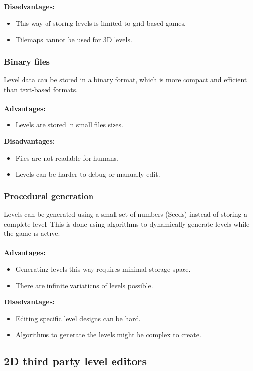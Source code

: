 \documentclass{article} %
\begin{document}
\noindent\textbf{Disadvantages:}
\begin{itemize}
	\item This way of storing levels is limited to grid-based games.
	\item Tilemaps cannot be used for 3D levels.
\end{itemize}

\subsubsection{Binary files}
Level data can be stored in a binary format, which is more compact and efficient than text-based formats.
\\\\
\textbf{Advantages:}
\begin{itemize}
	\item Levels are stored in small files sizes.
\end{itemize}
\noindent\textbf{Disadvantages:}
\begin{itemize}
	\item Files are not readable for humans.
	\item Levels can be harder to debug or manually edit.
\end{itemize}

\subsubsection{Procedural generation}
Levels can be generated using a small set of numbers (Seeds) instead of storing a complete level.
This is done using algorithms to dynamically generate levels while the game is active.
\\\\
\textbf{Advantages:}
\begin{itemize}
	\item Generating levels this way requires minimal storage space.
	\item There are infinite variations of levels possible.
\end{itemize}
\noindent\textbf{Disadvantages:}
\begin{itemize}
	\item Editing specific level designs can be hard.
	\item Algorithms to generate the levels might be complex to create.
\end{itemize}

\subsection{2D third party level editors}
\end{document}
